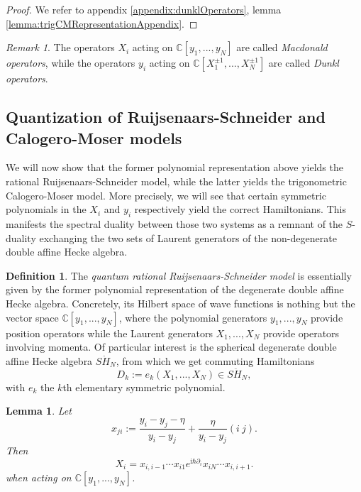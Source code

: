 \documentclass[11pt]{report}
\newtheorem{lemma}[theorem]{Lemma}
\theoremstyle{definition}
\newtheorem{definition}[theorem]{Definition}
\theoremstyle{remark}
\newtheorem*{remark}{Remark}
\theoremstyle{remark}
\newcommand{\C}{\mathbb{C}}
\newcommand{\I}{\mathrm{i}}
\begin{document}
\begin{proof}
We refer to appendix \ref{appendix:dunklOperators}, lemma \ref{lemma:trigCMRepresentationAppendix}.
\end{proof}

\begin{remark}
The operators $X_i$ acting on $\C[y_1,...,y_N]$ are called \emph{Macdonald operators}, while the operators $y_i$ acting on $\C[X_1^{\pm 1},...,X_N^{\pm 1}]$ are called \emph{Dunkl operators}.
\end{remark}

\subsection{Quantization of Ruijsenaars-Schneider and Calogero-Moser models}

We will now show that the former polynomial representation above yields the rational Ruijsenaars-Schneider model, while the latter yields the trigonometric Calogero-Moser model. More precisely, we will see that certain symmetric polynomials in the $X_i$ and $y_i$ respectively yield the correct Hamiltonians. This manifests the spectral duality between those two systems \cite{article:chalykh:2000} as a remnant of the $S$-duality exchanging the two sets of Laurent generators of the non-degenerate double affine Hecke algebra.

\begin{definition}
The \emph{quantum rational Ruijsenaars-Schneider model} is essentially given by the former polynomial representation of the degenerate double affine Hecke algebra. Concretely, its Hilbert space of wave functions is nothing but the vector space $\C[y_1,...,y_N]$, where the polynomial generators $y_1,...,y_N$ provide position operators while the Laurent generators $X_1,...,X_N$ provide operators involving momenta. Of particular interest is the spherical degenerate double affine Hecke algebra $S\ddot H_N$, from which we get commuting Hamiltonians
\begin{equation*}
D_k := e_k(X_1,...,X_N) \in S\ddot H_N,
\end{equation*}
with $e_k$ the $k$th elementary symmetric polynomial.
\end{definition}

\begin{lemma}
Let
\begin{equation*}
x_{ji} := \frac{y_i-y_j-\eta}{y_i-y_j} + \frac{\eta}{y_i-y_j} (i \ j).
\end{equation*}
Then
\begin{equation*}
X_i = x_{i,i-1} \cdots x_{i1} e^{\I \hbar \partial_i} x_{iN} \cdots x_{i,i+1}.
\end{equation*}
when acting on $\C[y_1,...,y_N]$.
\end{lemma}
\end{document}
